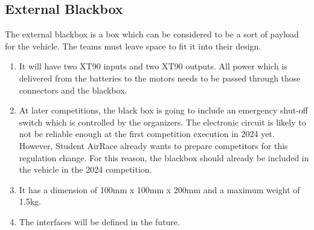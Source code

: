 \documentclass{article}
\begin{document}
\subsection{External Blackbox}
The external blackbox is a box which can be considered to be a sort of payload for the vehicle. The teams must leave space to fit it into their design.
\begin{enumerate}
  \item It will have two XT90 inputs and two XT90 outputs. All power which is delivered from the batteries to the motors needs to be passed through those connectors and the blackbox.
  \item At later competitions, the black box is going to include an emergency shut-off switch which is controlled by the organizers. The electronic circuit is likely to not be reliable enough at the first competition execution in 2024 yet. However, Student AirRace already wants to prepare competitors for this regulation change. For this reason, the blackbox should already be included in the vehicle in the 2024 competition.
  \item It has a dimension of 100mm x 100mm x 200mm and a maximum weight of 1.5kg.
  \item The interfaces will be defined in the future. 
\end{enumerate}
\end{document}
